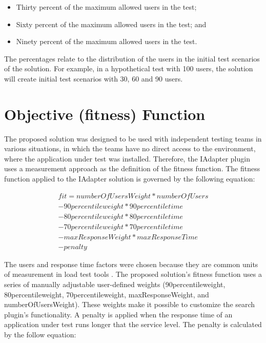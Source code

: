 \documentclass[espaco=umemeio,chapter=TITLE,twoside,openright]{abnt}
\begin{document}
\begin{itemize}
\item Thirty percent of the maximum allowed users in the test;
\item Sixty percent of the maximum allowed users in the test; and
\item Ninety percent of the maximum allowed users in the test.
\end{itemize}

The percentages relate to the distribution of the users in the initial test scenarios of the solution. For example, in a hypothetical test with 100 users, the solution will create initial test scenarios with 30, 60 and 90 users.

\section{Objective (fitness) Function}

The proposed solution was designed to be used with independent testing teams in various situations, in which the teams have no direct access to the environment, where the application under test was installed. Therefore, the IAdapter plugin uses a measurement approach as the definition of the fitness function. The fitness function applied to the IAdapter solution is governed by the following equation:

\begin{equation}
\begin{aligned}
fit=numberOfUsersWeight*numberOfUsers\\
-90percentileweight* 90percentiletime\\
-80percentileweight*80percentiletime\\
-70percentileweight*70percentiletime\\
-maxResponseWeight*maxResponseTime\\
-penalty
\end{aligned}
\end{equation}

The users and response time factors were chosen because they are common units of measurement in load test tools \cite{Sandler2004}. The proposed solution's fitness function uses a series of manually adjustable user-defined weights (90percentileweight, 80percentileweight,  70percentileweight, maxResponseWeight, and numberOfUsersWeight). These weights make it possible to customize the search plugin's functionality. A penalty is applied when the response time of an application under test runs longer that the service level. The penalty is calculated by the follow equation:
\end{document}
